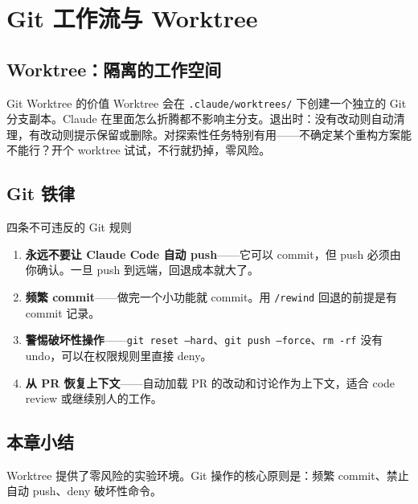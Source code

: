 \section{Git 工作流与 Worktree}

\subsection{Worktree：隔离的工作空间}

\begin{knowledgebox}{Git Worktree 的价值}
Worktree 会在 \texttt{.claude/worktrees/} 下创建一个独立的 Git 分支副本。Claude 在里面怎么折腾都不影响主分支。退出时：没有改动则自动清理，有改动则提示保留或删除。对探索性任务特别有用——不确定某个重构方案能不能行？开个 worktree 试试，不行就扔掉，零风险。
\end{knowledgebox}

\subsection{Git 铁律}

\begin{warningbox}{四条不可违反的 Git 规则}
\begin{enumerate}[leftmargin=1.5em]
  \item \textbf{永远不要让 Claude Code 自动 push}——它可以 commit，但 push 必须由你确认。一旦 push 到远端，回退成本就大了。
  \item \textbf{频繁 commit}——做完一个小功能就 commit。用 \texttt{/rewind} 回退的前提是有 commit 记录。
  \item \textbf{警惕破坏性操作}——\texttt{git reset --hard}、\texttt{git push --force}、\texttt{rm -rf} 没有 undo，可以在权限规则里直接 deny。
  \item \textbf{从 PR 恢复上下文}——自动加载 PR 的改动和讨论作为上下文，适合 code review 或继续别人的工作。
\end{enumerate}
\end{warningbox}

\subsection{本章小结}

Worktree 提供了零风险的实验环境。Git 操作的核心原则是：频繁 commit、禁止自动 push、deny 破坏性命令。

